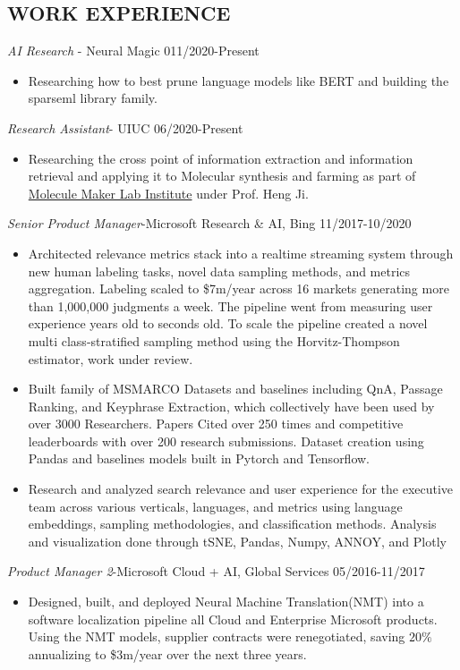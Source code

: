 \documentclass[line,margin]{res}
\begin{document}
\begin{resume}
\section{WORK EXPERIENCE}
{\sl AI Research} - Neural Magic \hfill 011/2020-Present
\begin{itemize}  \itemsep -4pt 
\item Researching how to best prune language models like BERT and building the sparseml library family.  
\end{itemize}
{\sl Research Assistant}- UIUC \hfill 06/2020-Present
\begin{itemize}  \itemsep -4pt 
\item Researching the cross point of information extraction and information retrieval and applying it to Molecular synthesis and farming as part of \href{https://moleculemaker.org/}{Molecule Maker Lab Institute} under Prof. Heng Ji. 
\end{itemize}
{\sl Senior Product Manager}-Microsoft Research \& AI,  Bing  \hfill 11/2017-10/2020
\begin{itemize}  \itemsep -4pt 
\item Architected relevance metrics stack into a realtime streaming system through new human labeling tasks, novel data sampling methods, and metrics aggregation. Labeling scaled to \$7m/year across 16 markets generating more than 1,000,000 judgments a week. The pipeline went from measuring user experience years old to seconds old. To scale the pipeline created a novel multi class-stratified sampling method using the Horvitz-Thompson estimator, work under review.
\item  Built family of MSMARCO Datasets and baselines including QnA, Passage Ranking, and Keyphrase Extraction, which collectively have been used by over 3000 Researchers. Papers Cited over 250 times and competitive leaderboards with over 200 research submissions. Dataset creation using Pandas and baselines models built in Pytorch and Tensorflow.
\item Research and analyzed search relevance and user experience for the executive team across various verticals, languages, and metrics using language embeddings, sampling methodologies, and classification methods. Analysis and visualization done through tSNE, Pandas, Numpy, ANNOY, and Plotly
\end{itemize}
{\sl Product Manager 2}-Microsoft Cloud + AI, Global Services \hfill 05/2016-11/2017
\begin{itemize}  \itemsep -4pt
\item Designed, built, and deployed Neural Machine Translation(NMT) into a software localization pipeline all Cloud and Enterprise Microsoft products. Using the NMT models, supplier contracts were renegotiated, saving $20\%$ annualizing to \$3m/year over the next three years.

\end{itemize}
\end{resume}
\end{document}
